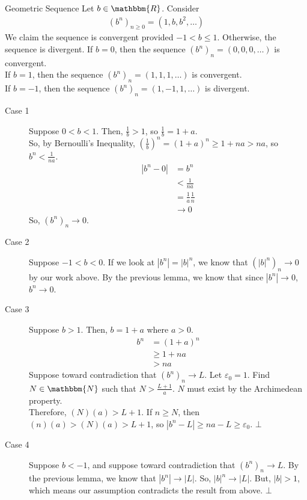 \documentclass[10pt]{extarticle}
\newcommand{\N}{\mathbbm{N}}
\newcommand{\R}{\mathbbm{R}}
\begin{document}
  \begin{problem}{Geometric Sequence}
    Let $b\in\R$. Consider
    \begin{align*}
      \left(b^n\right)_{n\geq 0} = (1,b,b^2,\dots)
    \end{align*}
    We claim the sequence is convergent provided $-1 < b \leq 1$. Otherwise, the sequence is divergent.
    \tcblower
    If $b = 0$, then the sequence $(b^n)_{n} = (0,0,0,\dots)$ is convergent.\\

    If $b = 1$, then the sequence $(b^n)_n = (1,1,1,\dots)$ is convergent.\\

    If $b = -1$, then the sequence $(b^n)_n = (1,-1,1,\dots)$ is divergent.
    \begin{description}
      \item[Case 1] Suppose $0 < b < 1$. Then, $\frac{1}{b}> 1$, so $\frac{1}{b} = 1+a$.\\

        So, by Bernoulli's Inequality, $\left(\frac{1}{b}\right)^n = \left(1+a\right)^n \geq 1 + na > na$, so $b^n < \frac{1}{na}$.
        \begin{align*}
          |b^n-0| &= b^n\\
                  &< \frac{1}{na}\\
                  &= \frac{1}{a}\frac{1}{n}\\
                  &\rightarrow 0
        \end{align*}
        So, $\left(b^n\right)_n \rightarrow 0$.
      \item[Case 2] Suppose $-1 < b < 0$. If we look at $|b^n| = |b|^n$, we know that $\left(|b|^n\right)_n \rightarrow 0$ by our work above. By the previous lemma, we know that since $|b^n|\rightarrow 0$, $b^n \rightarrow 0$.
      \item[Case 3] Suppose $b > 1$. Then, $b = 1 + a$ where $a > 0$.
        \begin{align*}
          b^n &= (1+a)^n\\
              &\geq 1 + na \tag*{Bernoulli's Inequality}\\
              &> na
        \end{align*}
        Suppose toward contradiction that $\left(b^n\right)_n \rightarrow L$. Let $\varepsilon_0 = 1$. Find $N\in \N$ such that $N > \frac{L + 1}{a}$. $N$ must exist by the Archimedean property.\\

        Therefore, $(N)(a) > L+1$. If $n\geq N$, then $(n)(a) > (N)(a) > L+1$, so $|b^n - L| \geq na - L \geq \varepsilon_0$. $\bot$
      \item[Case 4] Suppose $b < -1$, and suppose toward contradiction that $(b^n)_n \rightarrow L$. By the previous lemma, we know that $|b^n| \rightarrow |L|$. So, $|b|^n \rightarrow |L|$. But, $|b| > 1$, which means our assumption contradicts the result from above. $\bot$
    \end{description}
  \end{problem}
\end{document}
